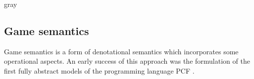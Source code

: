 \documentclass[acmsmall,authordraft]{acmart}
\newcommand{\refby}{\preceq}
\begin{document}
\begin{color}{gray}


%
%
%

\end{color}

\subsection{Game semantics} \label{sec:gamesem} %


Game semantics is a form of denotational semantics which
incorporates some operational aspects.
An early success of this approach was
the formulation of the first fully abstract models
of the programming language PCF \cite{pcfajm,pcfho}.
\end{document}
